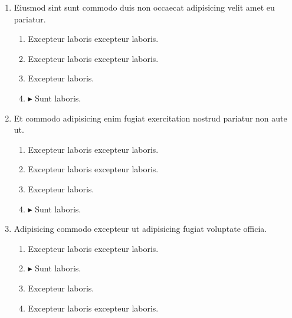 \documentclass[a4paper,12pt]{article}
\begin{document}
\begin{enumerate}[label=\textbf{\arabic*.}]
\begin{multicols}{2}
\end{multicols}
\item Eiusmod sint sunt commodo duis non occaecat adipisicing velit amet eu pariatur.
\begin{multicols}{2}
	\begin{enumerate}
		\item  Excepteur laboris excepteur laboris.
    
		\item  Excepteur laboris excepteur laboris.
  
		\item  Excepteur laboris.
    
		\item $\blacktriangleright$  Sunt laboris.
    
	\end{enumerate}

\end{multicols}
\item Et commodo adipisicing enim fugiat exercitation nostrud pariatur non aute ut.
\begin{multicols}{2}
	\begin{enumerate}
		\item  Excepteur laboris excepteur laboris.
    
		\item  Excepteur laboris excepteur laboris.
  
		\item  Excepteur laboris.
    
		\item $\blacktriangleright$  Sunt laboris.
    
	\end{enumerate}

\end{multicols}
\item Adipisicing commodo excepteur ut adipisicing fugiat voluptate officia.
\begin{multicols}{2}
	\begin{enumerate}
		\item  Excepteur laboris excepteur laboris.
  
		\item $\blacktriangleright$  Sunt laboris.
    
		\item  Excepteur laboris.
    
		\item  Excepteur laboris excepteur laboris.
    

\end{enumerate}
\end{multicols}
\end{enumerate}
\end{document}
